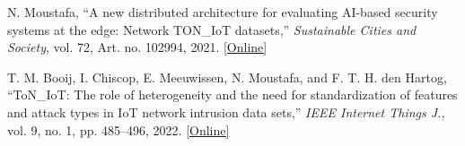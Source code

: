 N. Moustafa, ``A new distributed architecture for evaluating AI-based security systems at the edge: Network TON\_IoT datasets,'' \emph{Sustainable Cities and Society}, vol. 72, Art. no. 102994, 2021. \href{https://doi.org/10.1016/j.scs.2021.102994}{[Online]}

T. M. Booij, I. Chiscop, E. Meeuwissen, N. Moustafa, and F. T. H. den Hartog, ``ToN\_IoT: The role of heterogeneity and the need for standardization of features and attack types in IoT network intrusion data sets,'' \emph{IEEE Internet Things J.}, vol. 9, no. 1, pp. 485--496, 2022. \href{https://doi.org/10.1109/JIOT.2021.3085194}{[Online]}